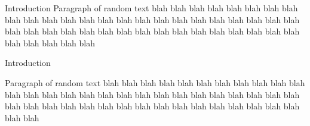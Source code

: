 \documentclass[final]{beamer}
\begin{document}
\begin{frame}

\begin{alertblock}{Introduction}
Paragraph of random text blah blah blah blah blah blah blah blah blah blah blah blah blah blah blah blah blah blah blah blah blah blah blah blah blah blah blah blah blah blah blah blah blah blah blah blah blah blah blah blah blah blah blah blah blah
\end{alertblock}

\begin{alertblock}{Introduction}
\centering
\parbox{.8\textwidth}{Paragraph of random text blah blah blah blah blah blah blah blah blah blah blah blah blah blah blah blah blah blah blah blah blah blah blah blah blah blah blah blah blah blah blah blah blah blah blah blah blah blah blah blah blah blah blah blah blah}
\end{alertblock}


\end{frame}
\end{document}
